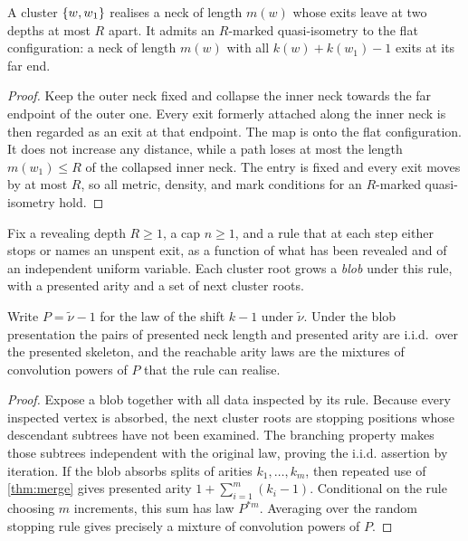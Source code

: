 \begin{lemma}[Flattening]
\label{thm:cluster-flat}
\leanok
{}
A cluster $\{w,w_1\}$ realises a neck of length $m(w)$ whose exits leave at two depths at most
$R$ apart. It admits an $R$-marked quasi-isometry to the flat configuration: a neck of length
$m(w)$ with all $k(w)+k(w_1)-1$ exits at its far end.
\end{lemma}

\begin{proof}
\leanok
{}
Keep the outer neck fixed and collapse the inner neck towards the far endpoint of the outer one.
Every exit formerly attached along the inner neck is then regarded as an exit at that endpoint.
The map is onto the flat configuration. It does not increase any distance, while a path loses at
most the length $m(w_1)\leq R$ of the collapsed inner neck. The entry is fixed and every exit
moves by at most $R$, so all metric, density, and mark conditions for an $R$-marked
quasi-isometry hold.
\end{proof}

\begin{definition}
\label{def:blob}
\leanok
{}
Fix a revealing depth $R\geq1$, a cap $n\geq1$, and a rule that at each step either stops or
names an unspent exit, as a function of what has been revealed and of an independent uniform
variable. Each cluster root grows a \emph{blob} under this rule, with a presented arity and a
set of next cluster roots.
\end{definition}

\begin{lemma}
\label{thm:blob-law}
\leanok
{}
Write $P=\widetilde\nu-1$ for the law of the shift $k-1$ under $\widetilde\nu$. Under the blob
presentation the pairs of presented neck length and presented arity are i.i.d.\ over the
presented skeleton, and the reachable arity laws are the mixtures of convolution powers of $P$
that the rule can realise.
\end{lemma}

\begin{proof}
\leanok
{}
Expose a blob together with all data inspected by its rule. Because every inspected vertex is
absorbed, the next cluster roots are stopping positions whose descendant subtrees have not been
examined. The branching property makes those subtrees independent with the original law, proving
the i.i.d. assertion by iteration. If the blob absorbs splits of arities
$k_1,\dots,k_m$, then repeated use of \cref{thm:merge} gives presented arity
$1+\sum_{i=1}^m(k_i-1)$. Conditional on the rule choosing $m$ increments, this sum has law
$P^{*m}$. Averaging over the random stopping rule gives precisely a mixture of convolution
powers of $P$.
\end{proof}


